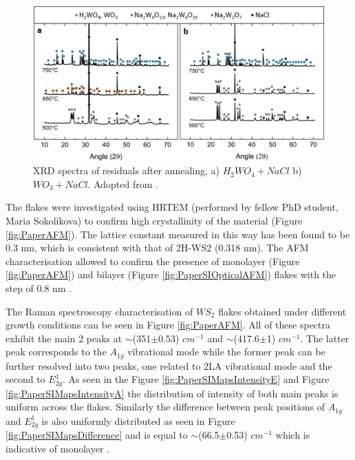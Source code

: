 \begin{figure}[H]
	\begin{center}
		\includegraphics[scale=0.3]{PaperSIXRD.png}
		\caption{XRD spectra of residuals after annealing, a) $H_2WO_4+NaCl$ b) $WO_3+NaCl$. Adopted from \cite{Reale2017}.}
		\label{fig:PaperSIXRD}
	\end{center}
\end{figure}

The flakes were investigated using HRTEM (performed by fellow PhD student, Maria Sokolikova) to confirm high crystallinity of the material (Figure \ref{fig:PaperAFM}). The lattice constant measured in this way has been found to be 0.3 nm, which is consistent with that of 2H-WS2 (0.318 nm). The AFM characterisation allowed to confirm the presence of monolayer (Figure \ref{fig:PaperAFM}) and bilayer (Figure \ref{fig:PaperSIOpticalAFM}) flakes with the step of 0.8 nm \cite{Wu2014}\cite{Rasmussen2015}.

The Raman spectroscopy characterisation of $WS_2$ flakes obtained under different growth conditions can be seen in Figure \ref{fig:PaperAFM}. All of these spectra exhibit the main 2 peaks at {$\sim$}(351{$\pm$}0.53) $cm^{−1}$ and {$\sim$}(417.6{$\pm$}1) $cm^{−1}$. The latter peak corresponds to the $A_{1g}$ vibrational mode while the former peak can be further resolved into two peaks, one related to 2LA vibrational mode and the second to $E^1_{2g}$. As seen in the Figure \ref{fig:PaperSIMapsIntensityE} and Figure \ref{fig:PaperSIMapsIntensityA} the distribution of intensity of both main peaks is uniform across the flakes. Similarly the difference between peak positions of $A_{1g}$ and $E^1_{2g}$ is also uniformly distributed as seen in Figure \ref{fig:PaperSIMapsDifference} and is equal to {$\sim$}(66.5{$\pm$}0.53) $cm^{−1}$ which is indicative of monolayer \cite{Withers2014}.

